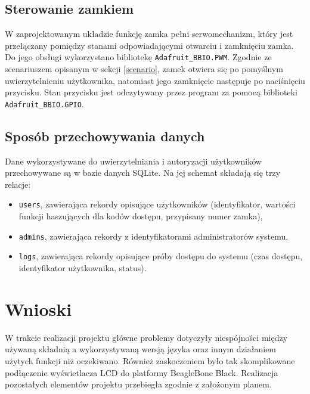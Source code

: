 \documentclass[polish,polish,a4paper]{article}
\begin{document}
	\subsection{Sterowanie zamkiem}
	W zaprojektowanym układzie funkcję zamka pełni serwomechanizm, który jest przełączany pomiędzy stanami odpowiadającymi otwarciu i zamknięciu zamka. Do jego obsługi wykorzystano bibliotekę \linebreak\verb|Adafruit_BBIO.PWM|. Zgodnie ze scenariuszem opisanym w sekcji \ref{scenario}, zamek otwiera się po pomyślnym uwierzytelnieniu użytkownika, natomiast jego zamknięcie następuje po naciśnięciu przycisku. Stan przycisku jest odczytywany przez program za pomocą biblioteki \verb|Adafruit_BBIO.GPIO|.
	
	\subsection{Sposób przechowywania danych}
	Dane wykorzystywane do uwierzytelniania i autoryzacji użytkowników przechowywane są w bazie danych SQLite. Na jej schemat składają się trzy relacje:
	\begin{itemize}
		\item \verb|users|, zawierająca rekordy opisujące użytkowników (identyfikator, wartości funkcji haszujących dla kodów dostępu, przypisany numer zamka),
		\item \verb|admins|, zawierająca rekordy z identyfikatorami administratorów systemu,
		\item \verb|logs|, zawierająca rekordy opisujące próby dostępu do systemu (czas dostępu, identyfikator użytkownika, status).
	\end{itemize}
	
	\section{Wnioski}
	W trakcie realizacji projektu główne problemy dotyczyły niespójności między używaną składnią a wykorzystywaną wersją języka oraz innym działaniem użytych funkcji niż oczekiwano. Również zaskoczeniem było tak skomplikowane podłączenie wyświetlacza LCD do platformy BeagleBone Black. Realizacja pozostałych elementów projektu przebiegła zgodnie z założonym planem.
	
\end{document}

